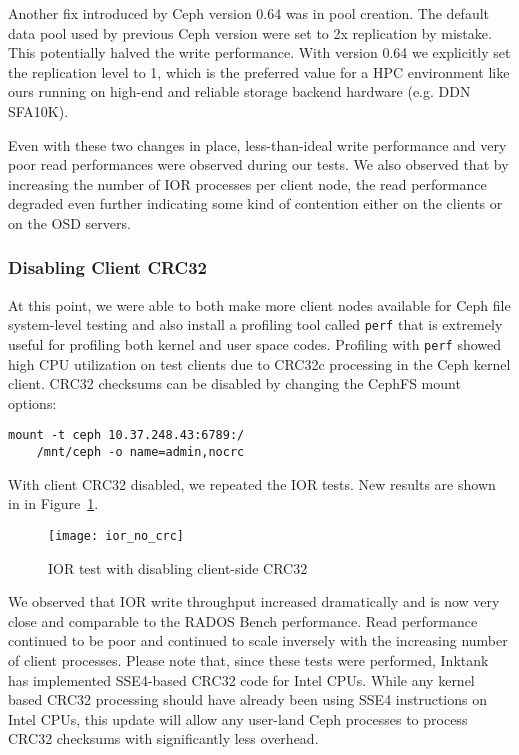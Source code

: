 Another fix introduced by Ceph version 0.64 was in pool creation.  The default
data pool used by previous Ceph version were set to 2x replication by mistake.
This potentially halved the write performance. With version 0.64 we explicitly
set the replication level to 1, which is the preferred value for a HPC
environment like ours running on high-end and reliable storage backend hardware
(e.g. DDN SFA10K).

Even with these two changes in place, less-than-ideal write performance and
very poor read performances were observed during our tests.  We also observed
that by increasing the number of IOR processes per client node, the read
performance degraded even further indicating some kind of contention either on
the clients or on the OSD servers.


\subsubsection{Disabling Client CRC32}

At this point, we were able to both make more client nodes available for Ceph
file system-level testing and also install a profiling tool called \verb!perf!
that is extremely useful for profiling both kernel and user space codes.
Profiling with \verb!perf! showed high CPU utilization on test clients due to
CRC32c processing in the Ceph kernel client.  CRC32 checksums can be disabled
by changing the CephFS mount options:

\begin{Verbatim}[fontsize=\small]
mount -t ceph 10.37.248.43:6789:/ 
    /mnt/ceph -o name=admin,nocrc
\end{Verbatim}


With client CRC32 disabled, we repeated the IOR tests. New results are shown in
in Figure~\ref{fig:ior-no-client-crc32}. 

\begin{figure}[htb]
\centering
\texttt{[image: ior\_no\_crc]}
\caption{IOR test with disabling client-side CRC32}
\label{fig:ior-no-client-crc32}
\end{figure}

We observed that IOR write throughput increased dramatically and is now very
close and comparable to the RADOS Bench performance. Read performance continued
to be poor and continued to scale inversely with the increasing number of
client processes.  Please note that, since these tests were performed, Inktank
has implemented SSE4-based CRC32 code for Intel CPUs.  While any kernel based
CRC32 processing should have already been using SSE4 instructions on Intel
CPUs, this update will allow any user-land Ceph processes to process CRC32
checksums with significantly less overhead.

